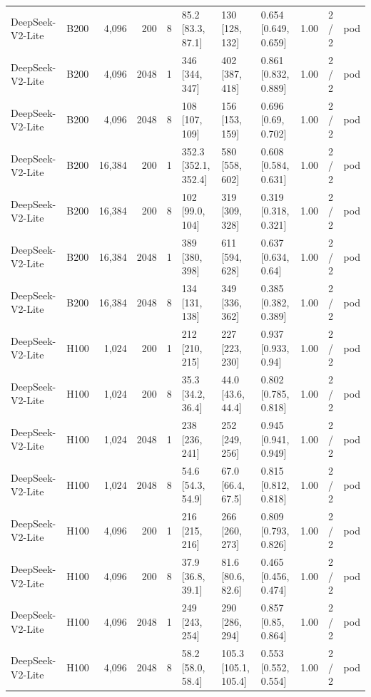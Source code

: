 \begin{landscape}
\begin{longtable}{llrrrlllrll}
DeepSeek-V2-Lite & B200 & 4,096 & 200 & 8 & 85.2 {[}83.3, 87.1{]} & 130 {[}128, 132{]} & 0.654 {[}0.649, 0.659{]} & 1.00 & 2 / 2 & pod \\
DeepSeek-V2-Lite & B200 & 4,096 & 2048 & 1 & 346 {[}344, 347{]} & 402 {[}387, 418{]} & 0.861 {[}0.832, 0.889{]} & 1.00 & 2 / 2 & pod \\
DeepSeek-V2-Lite & B200 & 4,096 & 2048 & 8 & 108 {[}107, 109{]} & 156 {[}153, 159{]} & 0.696 {[}0.69, 0.702{]} & 1.00 & 2 / 2 & pod \\
DeepSeek-V2-Lite & B200 & 16,384 & 200 & 1 & 352.3 {[}352.1, 352.4{]} & 580 {[}558, 602{]} & 0.608 {[}0.584, 0.631{]} & 1.00 & 2 / 2 & pod \\
DeepSeek-V2-Lite & B200 & 16,384 & 200 & 8 & 102 {[}99.0, 104{]} & 319 {[}309, 328{]} & 0.319 {[}0.318, 0.321{]} & 1.00 & 2 / 2 & pod \\
DeepSeek-V2-Lite & B200 & 16,384 & 2048 & 1 & 389 {[}380, 398{]} & 611 {[}594, 628{]} & 0.637 {[}0.634, 0.64{]} & 1.00 & 2 / 2 & pod \\
DeepSeek-V2-Lite & B200 & 16,384 & 2048 & 8 & 134 {[}131, 138{]} & 349 {[}336, 362{]} & 0.385 {[}0.382, 0.389{]} & 1.00 & 2 / 2 & pod \\
DeepSeek-V2-Lite & H100 & 1,024 & 200 & 1 & 212 {[}210, 215{]} & 227 {[}223, 230{]} & 0.937 {[}0.933, 0.94{]} & 1.00 & 2 / 2 & pod \\
DeepSeek-V2-Lite & H100 & 1,024 & 200 & 8 & 35.3 {[}34.2, 36.4{]} & 44.0 {[}43.6, 44.4{]} & 0.802 {[}0.785, 0.818{]} & 1.00 & 2 / 2 & pod \\
DeepSeek-V2-Lite & H100 & 1,024 & 2048 & 1 & 238 {[}236, 241{]} & 252 {[}249, 256{]} & 0.945 {[}0.941, 0.949{]} & 1.00 & 2 / 2 & pod \\
DeepSeek-V2-Lite & H100 & 1,024 & 2048 & 8 & 54.6 {[}54.3, 54.9{]} & 67.0 {[}66.4, 67.5{]} & 0.815 {[}0.812, 0.818{]} & 1.00 & 2 / 2 & pod \\
DeepSeek-V2-Lite & H100 & 4,096 & 200 & 1 & 216 {[}215, 216{]} & 266 {[}260, 273{]} & 0.809 {[}0.793, 0.826{]} & 1.00 & 2 / 2 & pod \\
DeepSeek-V2-Lite & H100 & 4,096 & 200 & 8 & 37.9 {[}36.8, 39.1{]} & 81.6 {[}80.6, 82.6{]} & 0.465 {[}0.456, 0.474{]} & 1.00 & 2 / 2 & pod \\
DeepSeek-V2-Lite & H100 & 4,096 & 2048 & 1 & 249 {[}243, 254{]} & 290 {[}286, 294{]} & 0.857 {[}0.85, 0.864{]} & 1.00 & 2 / 2 & pod \\
DeepSeek-V2-Lite & H100 & 4,096 & 2048 & 8 & 58.2 {[}58.0, 58.4{]} & 105.3 {[}105.1, 105.4{]} & 0.553 {[}0.552, 0.554{]} & 1.00 & 2 / 2 & pod \\

\end{longtable}
\end{landscape}

